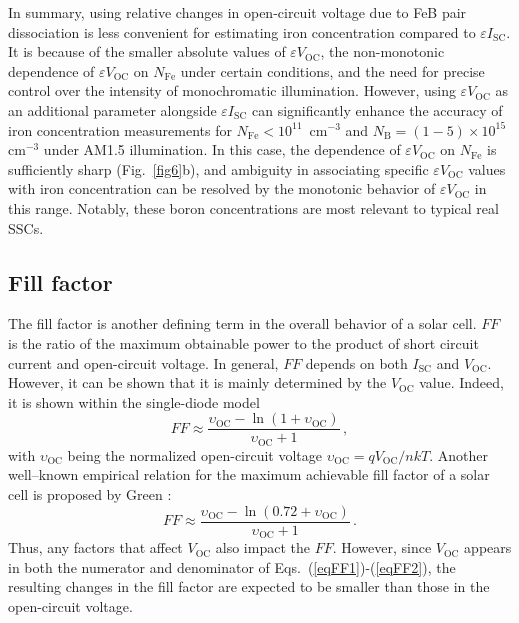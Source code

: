 \documentclass[a4paper,fleqn]{cas-sc}
\begin{document}
In summary, using relative changes in open-circuit voltage due to FeB pair dissociation is less convenient
for estimating iron concentration compared to $\varepsilon I_\mathrm{SC}$.
It is because of the smaller absolute values of $\varepsilon V_\mathrm{OC}$,
the non-monotonic dependence of $\varepsilon V_\mathrm{OC}$ on $N_\mathrm{Fe}$ under certain conditions,
and the need for precise control over the intensity of monochromatic illumination.
However, using $\varepsilon V_\mathrm{OC}$ as an additional parameter alongside $\varepsilon I_\mathrm{SC}$
can significantly enhance the accuracy of iron concentration measurements for $N_\mathrm{Fe}<10^{11}$~cm$^{-3}$
and $N_\mathrm{B}=(1-5)\times10^{15}$cm$^{-3}$ under AM1.5 illumination.
In this case, the dependence of $\varepsilon V_\mathrm{OC}$ on $N_\mathrm{Fe}$ is sufficiently sharp (Fig.~\ref{fig6}b),
and ambiguity in associating specific $\varepsilon V_\mathrm{OC}$ values with iron concentration can be resolved
by the monotonic behavior of $\varepsilon V_\mathrm{OC}$ in this range.
Notably, these boron concentrations are most relevant to typical real SSCs.



\subsection{Fill factor}
The fill factor is another defining term in the overall behavior of a solar cell.
$F\!F$ is the ratio of the maximum obtainable power to the product of short circuit current and open-circuit voltage.
In general, $F\!F$ depends on both $I_\mathrm{SC}$ and $V_\mathrm{OC}$.
However, it can be shown that it is mainly determined by the $V_\mathrm{OC}$ value.
Indeed, it is shown \cite{YangHandbookPVSi} within the single-diode model
\begin{equation}
\label{eqFF1}
    F\!F \approx \frac{\upsilon_\mathrm{OC}-\ln\left(1+\upsilon_\mathrm{OC}\right)}{\upsilon_\mathrm{OC}+1} \,,
\end{equation}
with $\upsilon_\mathrm{OC}$ being the normalized open-circuit voltage
$\upsilon_\mathrm{OC}=qV_\mathrm{OC}/nkT$.
Another well--known empirical relation for the maximum achievable fill factor of a solar cell is proposed by Green \cite{Green1981,Green1982}:
\begin{equation}
\label{eqFF2}
    F\!F \approx \frac{\upsilon_\mathrm{OC}-\ln\left(0.72+\upsilon_\mathrm{OC}\right)}{\upsilon_\mathrm{OC}+1} \,.
\end{equation}
Thus, any factors that affect $V_\mathrm{OC}$ also impact the $F\!F$.
However, since $V_\mathrm{OC}$ appears in both the numerator and denominator of Eqs.~(\ref{eqFF1})-(\ref{eqFF2}),
the resulting changes in the fill factor are expected to be smaller than those in the open-circuit voltage.
\end{document}
